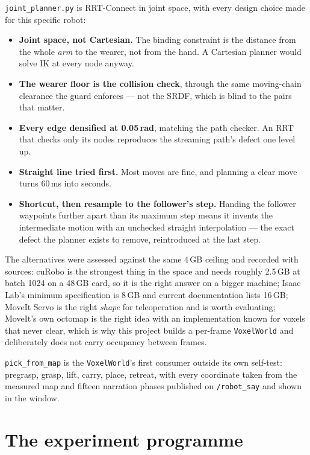 \documentclass[11pt,a4paper,oneside]{report}
\newcommand{\code}[1]{\texttt{\small #1}}
\newcommand{\file}[1]{\texttt{\small #1}}
\begin{document}
\file{joint\_planner.py} is RRT-Connect in joint space, with every design choice
made for this specific robot:

\begin{itemize}
\item \textbf{Joint space, not Cartesian.} The binding constraint is the
      distance from the whole \emph{arm} to the wearer, not from the hand. A
      Cartesian planner would solve IK at every node anyway.
\item \textbf{The wearer floor is the collision check}, through the same
      moving-chain clearance the guard enforces --- not the SRDF, which is
      blind to the pairs that matter.
\item \textbf{Every edge densified at 0.05\,rad}, matching the path checker. An
      RRT that checks only its nodes reproduces the streaming path's defect one
      level up.
\item \textbf{Straight line tried first.} Most moves are fine, and planning a
      clear move turns 60\,ms into seconds.
\item \textbf{Shortcut, then resample to the follower's step.} Handing the
      follower waypoints further apart than its maximum step means it invents
      the intermediate motion with an unchecked straight interpolation --- the
      exact defect the planner exists to remove, reintroduced at the last step.
\end{itemize}

The alternatives were assessed against the same 4\,GB ceiling and recorded with
sources: cuRobo is the strongest thing in the space and needs roughly 2.5\,GB at
batch 1024 on a 48\,GB card, so it is the right answer on a bigger machine;
Isaac Lab's minimum specification is 8\,GB and current documentation lists
16\,GB; MoveIt Servo is the right \emph{shape} for teleoperation and is worth
evaluating; MoveIt's own octomap is the right idea with an implementation known
for voxels that never clear, which is why this project builds a per-frame
\code{VoxelWorld} and deliberately does not carry occupancy between frames.

\code{pick\_from\_map} is the \code{VoxelWorld}'s first consumer outside its own
self-test: pregrasp, grasp, lift, carry, place, retreat, with every coordinate
taken from the measured map and fifteen narration phases published on
\code{/robot\_say} and shown in the window.

\chapter{The experiment programme}
\end{document}
